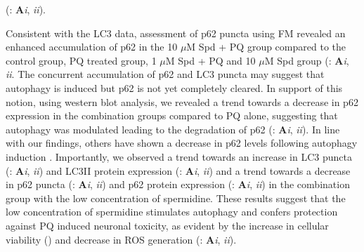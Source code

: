 (: \textbf{A}\textit{i}, \textit{ii}). 

 Consistent with the LC3 data, assessment of p62 puncta using FM revealed an enhanced accumulation of p62 in the 10 $\mu$M Spd + PQ group compared to the control group, PQ treated group, 1 $\mu$M Spd + PQ and 10 $\mu$M Spd group (: \textbf{A}\textit{i}, \textit{ii}. The concurrent accumulation of p62 and LC3 puncta may suggest that autophagy is induced but p62 is not yet completely cleared. In support of this notion, using western blot analysis, we revealed a trend towards a decrease in p62 expression in the combination groups compared to PQ alone, suggesting that autophagy was modulated leading to the degradation of p62 (: \textbf{A}\textit{i}, \textit{ii}). In line with our findings, others have shown a decrease in p62 levels following autophagy induction \citep{Bjorkoy2005,Jones2000,Zhou2017}. Importantly, we observed a trend towards an increase in LC3 puncta (: \textbf{A}\textit{i}, \textit{ii}) and LC3II protein expression (: \textbf{A}\textit{i}, \textit{ii}) and a trend towards a decrease in p62 puncta (: \textbf{A}\textit{i}, \textit{ii}) and p62 protein expression (: \textbf{A}\textit{i}, \textit{ii}) in the combination group with the low concentration of spermidine. These results suggest that the low concentration of spermidine stimulates autophagy and confers protection against PQ induced neuronal toxicity, as evident by the increase in cellular viability () and decrease in ROS generation (: \textbf{A}\textit{i}, \textit{ii}). 

